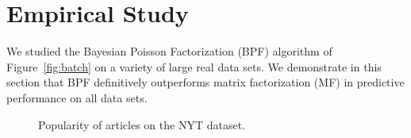 \section{Empirical Study}
We studied the Bayesian Poisson Factorization (BPF) algorithm of
Figure~\ref{fig:batch} on a variety of large real data sets. We
demonstrate in this section that BPF definitively outperforms matrix
factorization (MF) in predictive performance on all data sets.
\begin{figure}[th]
\centering
{}
\caption{Popularity of articles on the NYT dataset.}
\label{fig:nyt-expl}
\end{figure}

